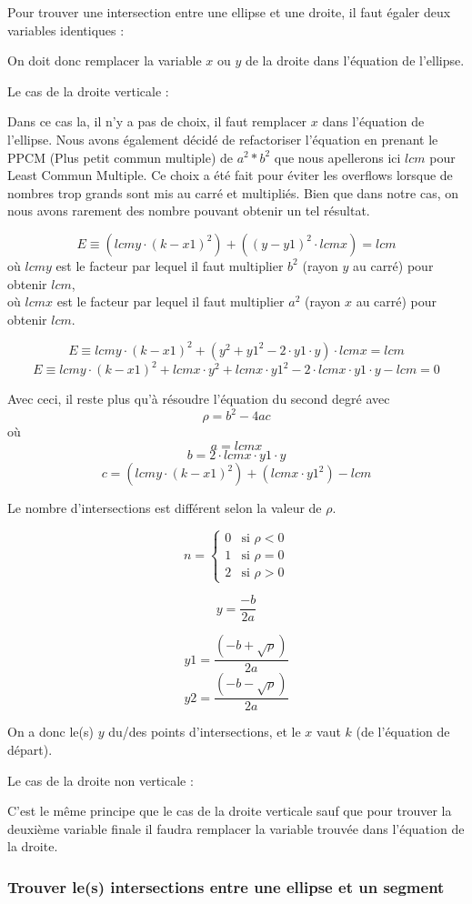 \documentclass[]{article}
\begin{document}
Pour trouver une intersection entre une ellipse
et une droite, il faut égaler deux variables 
identiques :


On doit donc remplacer la variable $x$ ou $y$ de la droite dans
l'équation de l'ellipse.

Le cas de la droite verticale : 

Dans ce cas la, il n'y a pas de choix, il faut remplacer
$x$ dans l'équation de l'ellipse.
Nous avons également décidé de refactoriser l'équation en 
prenant le PPCM (Plus petit commun multiple) de $a^2 * b^2$ que
nous apellerons ici $lcm$ pour Least Commun Multiple.
Ce choix a été fait pour éviter les overflows lorsque 
de nombres trop grands sont mis au carré et multipliés.
Bien que dans notre cas, on nous avons rarement des nombre
pouvant obtenir un tel résultat.

$$ E \equiv (lcmy \cdot (k - x1)^2) + ((y - y1)^2 \cdot lcmx) = lcm $$  
où $lcmy$ est le facteur par lequel il faut multiplier
$b^2$ (rayon $y$ au carré) pour obtenir $lcm$, \\
où $lcmx$ est le facteur par lequel il faut multiplier
$a^2$ (rayon $x$ au carré) pour obtenir $lcm$.

$$ E \equiv lcmy \cdot (k-x1)^2 + (y^2 + y1^2 - 2 \cdot y1 \cdot y)
\cdot lcmx = lcm$$
$$ E \equiv lcmy \cdot (k-x1)^2 + lcmx \cdot y^2 + lcmx \cdot
y1^2 - 2 \cdot lcmx \cdot y1 \cdot y - lcm = 0 $$

Avec ceci, il reste plus qu'à résoudre l'équation du second degré 
avec 
$$ \rho = b^2 - 4ac$$
où $$ a = lcmx $$
$$ b = 2 \cdot lcmx \cdot y1 \cdot y $$
$$ c = (lcmy \cdot (k-x1)^2) + (lcmx \cdot y1^2) - lcm $$



Le nombre d'intersections est différent selon la valeur de $\rho$.

\[
	n =
	\begin{cases}
		0 & \text{si } \rho < 0 \\
		1 & \text{si } \rho = 0 \\
		2 & \text{si } \rho > 0  
	\end{cases}
\]

$$ y = \frac {-b}{2a} $$

$$ y1 = \frac{(-b + \sqrt{\rho})}{2a} $$
$$ y2 = \frac{(-b - \sqrt{\rho})}{2a} $$

On a donc le(s) $y$ du/des points d'intersections, et le $x$
vaut $k$ (de l'équation de départ).



Le cas de la droite non verticale : 


C'est le même principe que le cas de la droite verticale sauf
que pour trouver la deuxième variable finale il faudra
remplacer la variable trouvée dans l'équation de la droite.

\subsubsection{Trouver le(s) intersections entre une ellipse et un segment}
\end{document}
